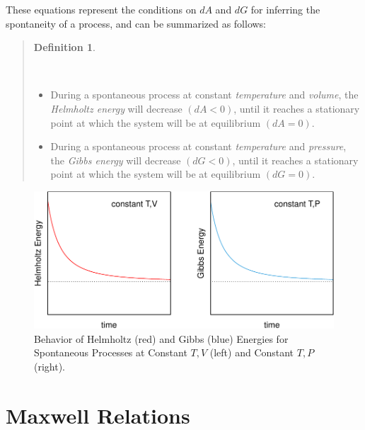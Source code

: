 \documentclass[
  9pt,
]{extbook}
\providecommand{\tightlist}{%
  \setlength{\itemsep}{0pt}\setlength{\parskip}{0pt}}
\theoremstyle{definition}
\newtheorem{definition}{Definition}[chapter]
\theoremstyle{definition}
\theoremstyle{definition}
\theoremstyle{definition}
\theoremstyle{remark}
\begin{document}
These equations represent the conditions on \(dA\) and \(dG\) for inferring the spontaneity of a process, and can be summarized as follows:

\begin{quote}
\begin{definition}
\protect\hypertarget{def:helmgibbsminimum}{}\label{def:helmgibbsminimum}

\(\;\)

\begin{itemize}
\tightlist
\item
  During a spontaneous process at constant \emph{temperature} and \emph{volume}, the \emph{Helmholtz energy} will decrease \((dA<0)\), until it reaches a stationary point at which the system will be at equilibrium \((dA=0)\).
\item
  During a spontaneous process at constant \emph{temperature} and \emph{pressure}, the \emph{Gibbs energy} will decrease \((dG<0)\), until it reaches a stationary point at which the system will be at equilibrium \((dG=0)\).
\end{itemize}

\end{definition}
\end{quote}

\begin{figure}

{\centering \includegraphics{pchem1_files/figure-latex/agfig-1} 

}

\caption{Behavior of Helmholtz (red) and Gibbs (blue) Energies for Spontaneous Processes at Constant $T,V$ (left) and Constant $T,P$ (right).}\label{fig:agfig}
\end{figure}

\section{Maxwell Relations}\label{maxwell}
\end{document}
